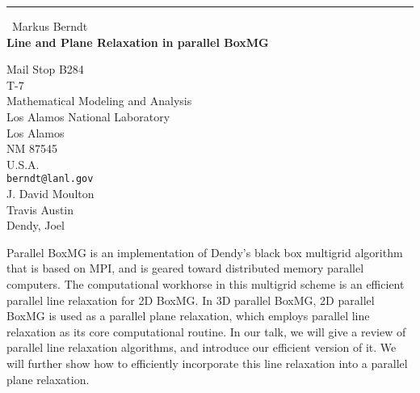 \documentclass{report}
\begin{document}
\begin{center}
\rule{6in}{1pt} \
{\large Markus Berndt \\
{\bf Line and Plane Relaxation in parallel BoxMG}}

Mail Stop B284 \\ T-7 \\ Mathematical Modeling and Analysis \\ Los Alamos National Laboratory \\ Los Alamos \\ NM 87545 \\ U.S.A.
\\
{\tt berndt@lanl.gov}\\
J. David Moulton\\
Travis Austin\\
	Dendy, Joel\end{center}

Parallel BoxMG is an implementation of Dendy's black box multigrid
algorithm that is based on MPI, and is geared toward distributed memory
parallel computers. The computational workhorse in this multigrid scheme
is an efficient parallel line relaxation for 2D BoxMG. In 3D parallel
BoxMG, 2D parallel BoxMG is used as a parallel plane relaxation, which
employs parallel line relaxation as its core computational routine. In
our talk, we will give a review of parallel line relaxation algorithms,
and introduce our efficient version of it. We will further show how to
efficiently incorporate this line relaxation into a parallel plane
relaxation.
\end{document}
